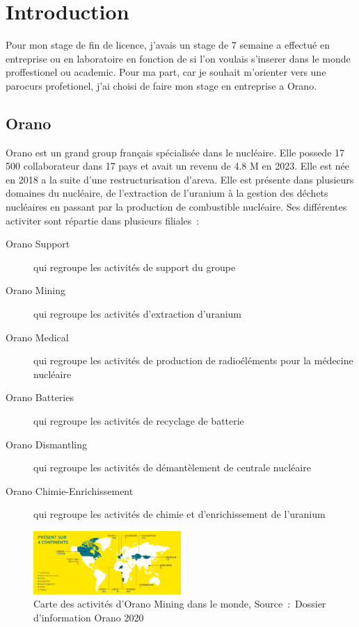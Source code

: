 \section{Introduction}

Pour mon stage de fin de licence, j'avais un stage de 7 semaine a effectué en entreprise ou en laboratoire en fonction de si l'on voulais s'inserer dans le monde proffestionel ou academic. Pour ma part, car je souhait m'orienter vers une parocurs profetionel, j'ai choisi de faire mon stage en entreprise a Orano.
\subsection{Orano}
Orano est un grand group français spécialisée dans le nucléaire. Elle possede 17 500 collaborateur dans 17 pays et avait un revenu de 4.8 M en 2023\cite{report:rapport_activiter}. Elle est née en 2018 a la suite d'une restructurisation d'areva. Elle est présente dans plusieurs domaines du nucléaire, de l'extraction de l'uranium à la gestion des déchets nucléaires en passant par la production de combustible nucléaire. Ses différentes activiter sont répartie dans plusieurs filiales~:
\begin{description}
    \item [Orano Support] qui regroupe les activités de support du groupe
    \item [Orano Mining] qui regroupe les activités d'extraction d'uranium
    \item [Orano Medical] qui regroupe les activités de production de radioéléments pour la médecine nucléaire
    \item [Orano Batteries] qui regroupe les activités de recyclage de batterie
    \item [Orano Dismantling] qui regroupe les activités de démantèlement de centrale nucléaire
    \item [Orano Chimie-Enrichissement] qui regroupe les activités de chimie et d'enrichissement de l'uranium
\end{description}
\begin{figure}
    \centering
    \includegraphics[width=0.5\textwidth]{img/Carte-ornao-international.png}
    \caption{Carte des activités d’Orano Mining dans le monde, Source~:~Dossier d’information Orano 2020}
    \label{fig_carte_orano}
\end{figure}









